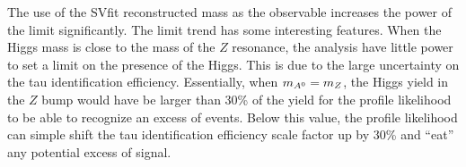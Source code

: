 %
The use of the SVfit reconstructed mass as the observable increases the power of
the limit significantly. The limit trend has some interesting features.   When
the Higgs mass is close to the mass of the $Z$ resonance, the analysis have
little power to set a limit on the presence of the Higgs.  This is due to the
large uncertainty on the tau identification efficiency.  Essentially, when
\mbox{$m_{A^0} = m_Z$}, the Higgs yield in the $Z$ bump would have be larger than
30\% of the \ZTT yield for the profile likelihood to be able to recognize an
excess of events. Below this value, the profile likelihood can simple shift the
tau identification efficiency scale factor up by 30\% and ``eat'' any potential
excess of signal.

